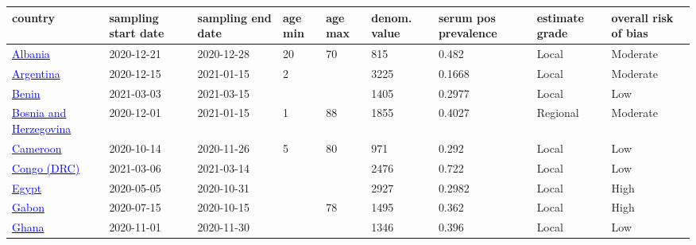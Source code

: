 \begin{table}[ht]  
    \footnotesize
    \begin{center}
        \begin{tabular}{p{2cm} | p{1.6cm} | p{1.6cm} | p{0.8cm} | p{0.8cm} | p{1cm} | p{1.3cm} | p{1.2cm} | p{1.2cm}}
            \hline

            \textbf{country} & \textbf{sampling start date} & \textbf{sampling end date} & \textbf{age min} & \textbf{age max} & \textbf{denom. value} & \textbf{serum pos prevalence} & \textbf{estimate grade} & \textbf{overall risk of bias} \\ 
            \hline 
            \href{https://doi.org/10.1101/2021.02.18.21251776}{\textcolor{blue}{Albania}} & 2020-12-21 & 2020-12-28 & 20 & 70 & 815 & 0.482 & Local & Moderate \\ 
            \hline 
            \href{https://dx.doi.org/10.1590/0102-311XES219821}{\textcolor{blue}{Argentina}} & 2020-12-15 & 2021-01-15 & 2 &  & 3225 & 0.1668 & Local & Moderate \\ 
            \hline 
            \href{https://dx.doi.org/10.1101/2022.04.26.22274330}{\textcolor{blue}{Benin}} & 2021-03-03 & 2021-03-15 &  &  & 1405 & 0.2977 & Local & Low \\ 
            \hline 
            \href{https://dx.doi.org/10.1371/journal.pone.0262738}{\textcolor{blue}{Bosnia and Herzegovina}} & 2020-12-01 & 2021-01-15 & 1 & 88 & 1855 & 0.4027 & Regional & Moderate \\ 
            \hline 
            \href{https://dx.doi.org/10.1038/s41467-021-25946-0}{\textcolor{blue}{Cameroon}} & 2020-10-14 & 2020-11-26 & 5 & 80 & 971 & 0.292 & Local & Low \\ 
            \hline 
            \href{https://dx.doi.org/10.3201/eid2901.221009}{\textcolor{blue}{Congo (DRC)}} & 2021-03-06 & 2021-03-14 &  &  & 2476 & 0.722 & Local & Low \\ 
            \hline 
            \href{http://dx.doi.org/10.1371/journal.pone.0254581}{\textcolor{blue}{Egypt}} & 2020-05-05 & 2020-10-31 &  &  & 2927 & 0.2982 & Local & High \\ 
            \hline 
            \href{https://dx.doi.org/10.1186/s13104-021-05570-3}{\textcolor{blue}{Gabon}} & 2020-07-15 & 2020-10-15 &  & 78 & 1495 & 0.362 & Local & High \\ 
            \hline 
            \href{https://dx.doi.org/10.1038/s41598-022-25598-0}{\textcolor{blue}{Ghana}} & 2020-11-01 & 2020-11-30 &  &  & 1346 & 0.396 & Local & Low \\ 

\end{tabular}
\end{center}
\end{table}
